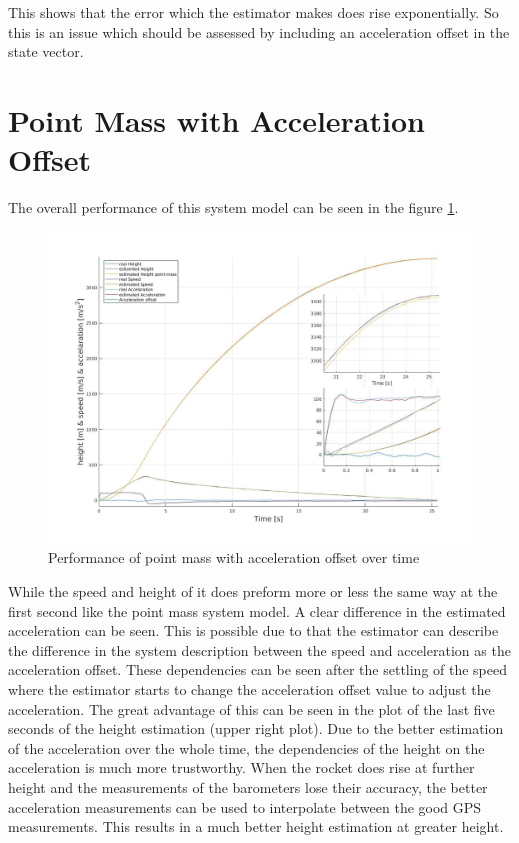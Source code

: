 This shows that the error which the estimator makes does rise exponentially.
So this is an issue which should be assessed by including an acceleration offset in the state vector.


\newpage
\section{Point Mass with Acceleration Offset}
The overall performance of this system model can be seen in the figure \ref{fig:PointMassOffsetPerformance}.

\begin{figure}[h!]
 \centering
 \includegraphics[width=.8 \textwidth]{./Pictures/PointMassOffsetPerformance.jpg}
 \caption{Performance of point mass with acceleration offset over time}
 \label{fig:PointMassOffsetPerformance}
\end{figure}

While the speed and height of it does preform more or less the same way at the first second like the point mass system model.
A clear difference in the estimated acceleration can be seen.
This is possible due to that the estimator can describe the difference in the system description between the speed and acceleration as the acceleration offset.
These dependencies can be seen after the settling of the speed where the estimator starts to change the acceleration offset value to adjust the acceleration.
The great advantage of this can be seen in the plot of the last five seconds of the height estimation (upper right plot).
Due to the better estimation of the acceleration over the whole time, the dependencies of the height on the acceleration is much more trustworthy.
When the rocket does rise at further height and the measurements of the barometers lose their accuracy,
the better acceleration measurements can be used to interpolate between the good GPS measurements.
This results in a much better height estimation at greater height.

